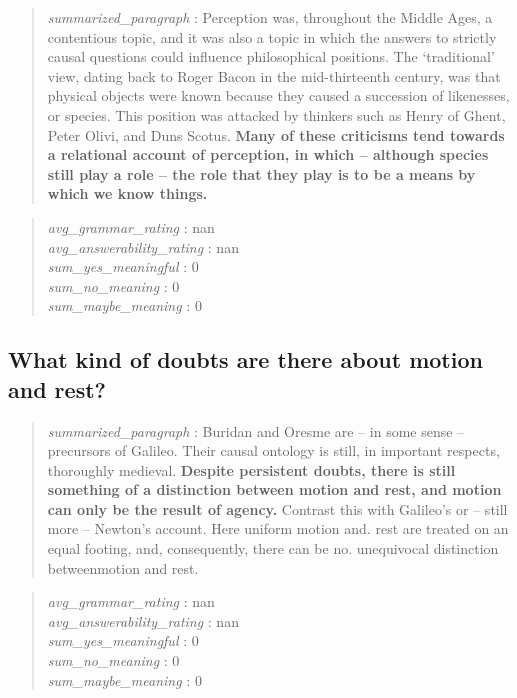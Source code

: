 \begin{quote}
\emph{summarized\_paragraph} : Perception was, throughout the Middle
Ages, a contentious topic, and it was also a topic in which the answers
to strictly causal questions could influence philosophical positions.
The `traditional' view, dating back to Roger Bacon in the mid-thirteenth
century, was that physical objects were known because they caused a
succession of likenesses, or species. This position was attacked by
thinkers such as Henry of Ghent, Peter Olivi, and Duns Scotus.
\textbf{Many of these criticisms tend towards a relational account of
perception, in which -- although species still play a role -- the role
that they play is to be a means by which we know things.}
\end{quote}

\begin{quote}
\emph{avg\_grammar\_rating} : nan\\
\emph{avg\_answerability\_rating} : nan\\
\emph{sum\_yes\_meaningful} : 0\\
\emph{sum\_no\_meaning} : 0\\
\emph{sum\_maybe\_meaning} : 0
\end{quote}

\hypertarget{what-kind-of-doubts-are-there-about-motion-and-rest}{%
\subsection{What kind of doubts are there about motion and
rest?}\label{what-kind-of-doubts-are-there-about-motion-and-rest}}

\begin{quote}
\emph{summarized\_paragraph} : Buridan and Oresme are -- in some sense
-- precursors of Galileo. Their causal ontology is still, in important
respects, thoroughly medieval. \textbf{Despite persistent doubts, there
is still something of a distinction between motion and rest, and motion
can only be the result of agency.} Contrast this with Galileo's or --
still more -- Newton's account. Here uniform motion and. rest are
treated on an equal footing, and, consequently, there can be no.
unequivocal distinction betweenmotion and rest.
\end{quote}

\begin{quote}
\emph{avg\_grammar\_rating} : nan\\
\emph{avg\_answerability\_rating} : nan\\
\emph{sum\_yes\_meaningful} : 0\\
\emph{sum\_no\_meaning} : 0\\
\emph{sum\_maybe\_meaning} : 0
\end{quote}

